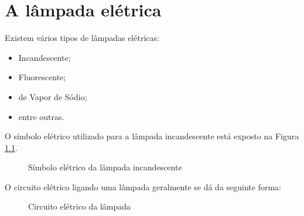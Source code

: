 \chapter{A lâmpada elétrica}
\label{sec:alampada}

Existem vários tipos de lâmpadas elétricas:
\begin{itemize}
\item Incandescente;
\item Fluorescente;
\item de Vapor de Sódio;
\item entre outras. %
\end{itemize}

O símbolo elétrico utilizado para a lâmpada incandescente está
exposto na Figura \ref{fig:simbolo_lampada}.

\begin{figure}[!htb]
\centering
{}
\caption{Símbolo elétrico da lâmpada incandescente}
\label{fig:simbolo_lampada}
\end{figure}

O circuito elétrico ligando uma lâmpada geralmente se dá da
seguinte forma:

\begin{figure}[!htb]
\centering
{}
\caption{Circuito elétrico da lâmpada}
\label{fig:circuito_lampada}
\end{figure}
